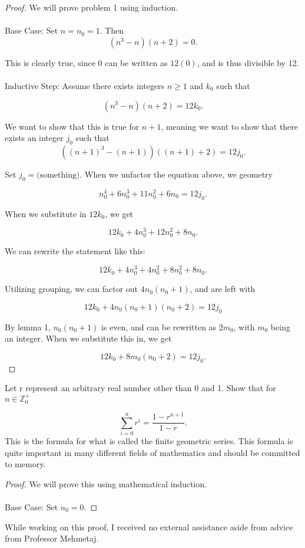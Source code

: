 \documentclass[12pt]{article}
\newenvironment{problem}[2][Problem]{\begin{trivlist}
\item[\hskip \labelsep {\bfseries #1}\hskip \labelsep {\bfseries #2.}]}{\end{trivlist}}
\begin{document}
\begin{proof} We will prove problem 1 using induction. \\ \\
    Base Case: Set $n = n_0 = 1$. Then
    $$(n^3 - n)(n + 2) = 0.$$

    This is clearly true, since 0 can be written as $12(0)$, and is thus divisible by 12. \\ \\

    Inductive Step: Assume there exists integers $n \geq 1$ and $k_0$ such that

    $$(n^3 - n)(n + 2) = 12k_0.$$

    We want to show that this is true for $n + 1$, meaning we want to show that there exists an integer $j_0$ such that
    $$((n+1)^3 - (n+1))((n+1) + 2) = 12j_0.$$

    Set $j_0 = \text{(something)}.$ When we unfactor the equation above, we geometry

    $$n_0^4 + 6n_0^3 + 11n_0^2 + 6n_0 = 12j_0.$$

    When we substitute in $12k_0$, we get 

    $$12k_0 + 4n_0^3 + 12n_0^2 + 8n_0.$$

    We can rewrite the statement like this:

    $$12k_0 + 4n_0^3 + 4n_0^2 + 8n_0^2 + 8n_0.$$

    Utilizing grouping, we can factor out $4n_0(n_0 + 1)$, and are left with

    $$12k_0 + 4n_0(n_0 + 1)(n_0 + 2) = 12j_0$$

    By lemma 1, $n_0(n_0 + 1)$ is even, and can be rewritten as $2m_0$, with $m_0$ being an integer. When we substitute this in, we get

    $$12k_0 + 8m_0(n_0 + 2) = 12j_0.$$


\end{proof}





\newpage
\begin{problem}{2}
    Let r represent an arbitrary real number other than 0 and 1. Show that for $n \in \mathbb{Z}_0^+$

    $$\sum_{i=0}^{n} r^i = \frac{1 - r^{n+1}}{1 - r}.$$
    This is the formula for what is called the finite geometric series. This formula is quite important in many different fields of mathematics and should be committed to memory.

\end{problem}

\begin{proof} We will prove this using mathematical induction. \\ \\

    Base Case: Set $n_0 = 0.$


\end{proof}


\noindent While working on this proof, I received no external assistance aside from advice from Professor Mehmetaj.
\end{document}

